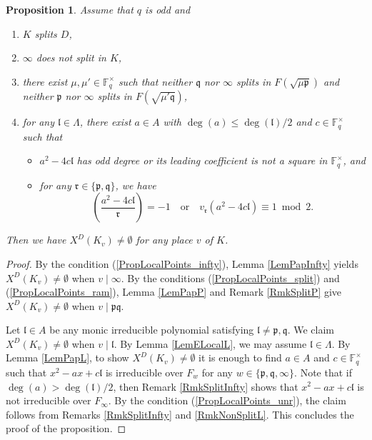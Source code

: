 \documentclass[10pt]{amsart}
\theoremstyle{plain}
\newtheorem{prop}[thm]{Proposition}
\theoremstyle{definition}
\newcommand{\bF}{\mathbb{F}}
\newcommand{\frl}{\mathfrak{l}}
\newcommand{\frp}{\mathfrak{p}}
\newcommand{\frq}{\mathfrak{q}}
\newcommand{\frr}{\mathfrak{r}}
\begin{document}
\begin{prop}\label{PropLocalPoints}
	Assume that $q$ is odd and 
	\begin{enumerate}
		\item\label{PropLocalPoints_split} $K$ splits $D$,
		\item\label{PropLocalPoints_infty} $\infty$ does not split in $K$,
		\item\label{PropLocalPoints_ram} there exist $\mu,\mu'\in \bF_q^\times$ such that neither $\frq$ nor $\infty$ splits in $F(\sqrt{\mu \frp})$ and 
		neither $\frp$ nor $\infty$ splits in $F(\sqrt{\mu' \frq})$,
		\item\label{PropLocalPoints_unr} for any $\frl\in \Lambda$, there exist $a\in A$ with $\deg(a)\leq \deg(\frl)/2$ and 
		$c\in\bF_q^\times$
		such that
		\begin{itemize}
			\item $a^2-4c\frl$ has odd degree or its leading coefficient is not a square in $\bF_q^\times$, and
			\item for any $\frr\in\{\frp,\frq\}$, we have
			\[
			\left(\frac{a^2-4c\frl}{\frr}\right)=-1\quad\text{or}\quad v_\frr(a^2-4c\frl)\equiv 1\bmod 2.
			\]
		\end{itemize} 
	\end{enumerate}
Then we have $X^D(K_v)\neq \emptyset$ for any place $v$ of $K$.
\end{prop}
\begin{proof}
	By the condition (\ref{PropLocalPoints_infty}), Lemma \ref{LemPapInfty} yields $X^D(K_v)\neq\emptyset$ when $v\mid \infty$. 
	By the conditions (\ref{PropLocalPoints_split}) and (\ref{PropLocalPoints_ram}),
	Lemma \ref{LemPapP} and Remark \ref{RmkSplitP} give $X^D(K_v)\neq\emptyset$ when $v\mid \frp\frq$.
	
	Let $\frl\in A$ be any monic irreducible polynomial satisfying $\frl\neq \frp,\frq$.
	We claim $X^D(K_v)\neq \emptyset$ when $v\mid\frl$.
	By Lemma \ref{LemELocalL}, we may assume $\frl\in\Lambda$. 
	By Lemma \ref{LemPapL}, to show $X^D(K_v)\neq\emptyset$ it is enough to find $a\in A$ and $c\in \bF_q^\times$ such that 
	$x^2-ax+c\frl$ is irreducible over $F_w$ for any $w\in \{\frp,\frq,\infty\}$.
	Note that if $\deg(a)>\deg(\frl)/2$, then Remark \ref{RmkSplitInfty} shows that $x^2-ax+c\frl$ is not irreducible over $F_\infty$.
	By the condition (\ref{PropLocalPoints_unr}), the claim follows from Remarks \ref{RmkSplitInfty} and \ref{RmkNonSplitL}. 
	This concludes the proof of the proposition.
\end{proof}
\end{document}
